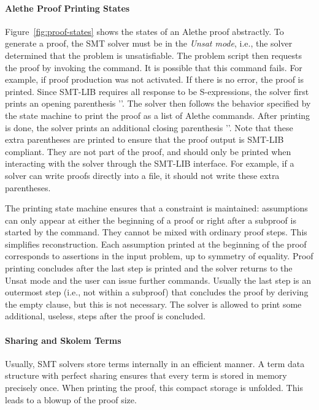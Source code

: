 \documentclass{scrartcl}
\begin{document}
\paragraph{Alethe Proof Printing States}
Figure~\ref{fig:proof-states} shows the states of an Alethe proof
abstractly.  To generate a proof, the SMT solver must be in the
{\em Unsat mode}, i.e., the solver determined that the problem
is unsatisfiable.
%
The {\smtlib} problem script then requests the proof by
invoking the  command.
%
It is possible that this command fails.
%
For example, if proof production was not activated.
%
If there is no error, the proof is printed.
Since SMT-LIB requires all response to be S-expressions, the solver first
prints an opening parenthesis '\inlineAlethe{(}'.
%
The solver then follows the behavior specified by the state machine to print the proof
as a list of Alethe commands.
%
After printing is done, the solver prints an additional
closing parenthesis '\inlineAlethe{)}'.
%
Note that these extra parentheses are printed to ensure that the proof output
is SMT-LIB compliant.
They are not part of the proof, and should only be printed when
interacting with the solver through the SMT-LIB interface.
For example, if a solver can write proofs directly into a file, it should not
write these extra parentheses.

The printing state machine ensures that a constraint is maintained:
assumptions can only appear at either the beginning of a proof or right
after a subproof is started by the  command.  They cannot
be mixed with ordinary proof steps.  This simplifies
reconstruction.  Each assumption printed at the beginning of the proof
corresponds to assertions in the input problem, up to symmetry of equality.
Proof printing concludes after the last step is printed and the solver
returns to the Unsat mode and the user can issue further commands.
Usually the last step is an outermost step
(i.e., not within a subproof) that concludes the proof by deriving
the empty clause, but this is not necessary.
The solver is allowed to print some additional, useless,
steps after the proof is concluded.


\paragraph{Sharing and Skolem Terms}
Usually, SMT solvers store terms internally in an efficient manner.  A term data
structure with perfect sharing ensures that every term is stored in memory
precisely once. When printing the proof, this compact storage is unfolded.
This leads to a blowup of the proof size.
\end{document}
